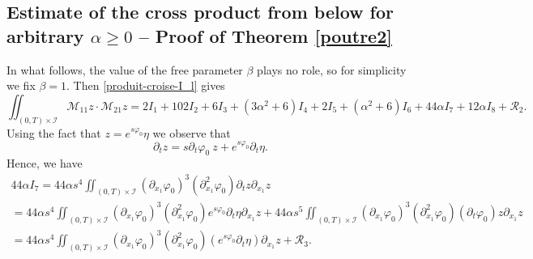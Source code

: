 \documentclass[a4paper, 12pt]{article}
\theoremstyle{plain}
\theoremstyle{definition}
\numberwithin{theorem}{section}
\numberwithin{equation}{section}
\begin{document}
{\subsection{Estimate of the cross product from below for arbitrary \texorpdfstring{$\alpha\geq 0$}{alpha} -- Proof of Theorem \ref{poutre2}} \label{section_proof_CarlEstpoutre_alphanonneg}

In what follows, the value of the free parameter $\beta$ plays no role, so  for simplicity we fix $\beta=1$. Then \eqref{produit-croise-I_l} gives
\begin{equation}\label{Eq11062025}
\iint_{(0,T)\times\mathcal{I}}\mathcal{M}_{11} z\cdot \mathcal{M}_{21} z= 2I_1+ 102I_2+ 6I_3+ (3\alpha^2+6) I_4+2 I_5+ (\alpha^2+6) I_6+44 \alpha I_7+12 \alpha I_8+\mathcal{R}_2.
\end{equation}
Using the fact that $z=e^{s\varphi_0}\eta$ we observe that
\begin{equation}\label{exp}
\partial_tz=s\partial_t\varphi_0~z+e^{s\varphi_0}\partial_t \eta.
\end{equation}
Hence, we have
\begin{multline*}
44 \alpha I_7=44 \alpha s^4\iint_{(0,T)\times\mathcal{I}}(\partial_{x_1}\varphi_0)^3(\partial^2_{x_1}\varphi_0)\partial_tz\partial_{x_1}z \\
=44 \alpha s^4\iint_{(0,T)\times\mathcal{I}}(\partial_{x_1}\varphi_0)^3(\partial^2_{x_1}\varphi_0)e^{s\varphi_0}\partial_t \eta \partial_{x_1}z+44\alpha s^5\iint_{(0,T)\times\mathcal{I}}(\partial_{x_1}\varphi_0)^3(\partial^2_{x_1}\varphi_0)(\partial_t\varphi_0)z\partial_{x_1}z\\
=44 \alpha s^4\iint_{(0,T)\times\mathcal{I}}(\partial_{x_1}\varphi_0)^3(\partial^2_{x_1}\varphi_0)(e^{s\varphi_0}\partial_t \eta)\partial_{x_1}z+\mathcal{R}_3.

\end{multline*}}
\end{document}
